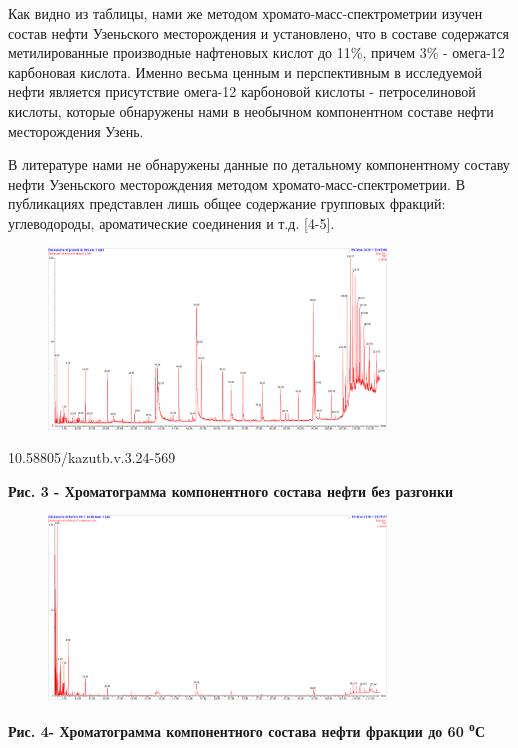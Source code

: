 Как видно из таблицы, нами же методом хромато-масс-спектрометрии изучен
состав нефти Узеньского месторождения и установлено, что в составе
содержатся метилированные производные нафтеновых кислот до 11\%, причем
3\% - омега-12 карбоновая кислота. Именно весьма ценным и перспективным
в исследуемой нефти является присутствие омега-12 карбоновой кислоты -
петроселиновой кислоты, которые обнаружены нами в необычном компонентном
составе нефти месторождения Узень.

В литературе нами не обнаружены данные по детальному компонентному
составу нефти Узеньского месторождения методом
хромато-масс-спектрометрии. В публикациях представлен лишь общее
содержание групповых фракций: углеводороды, ароматические соединения и
т.д. {[}4-5{]}.

\begin{figure}[H]
	\centering
	\includegraphics[width=0.8\textwidth]{assets/370}
	\caption*{}
\end{figure}10.58805/kazutb.v.3.24-569

{\bfseries Рис. 3 - Хроматограмма компонентного состава нефти без разгонки}

\begin{figure}[H]
	\centering
	\includegraphics[width=0.8\textwidth]{assets/371}
	\caption*{}
\end{figure}

{\bfseries Рис. 4- Хроматограмма компонентного состава нефти фракции до 60
\textsuperscript{о}С}

